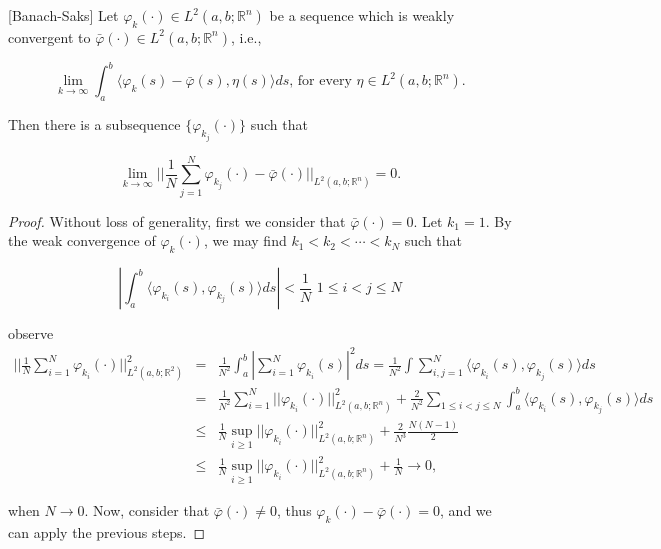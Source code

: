 \begin{theorem}\label{BST}[Banach-Saks]
Let $\varphi_k(\cdot)\in L^2(a,b;\mathbb{R}^n)$ be a sequence which is weakly convergent to $\bar{\varphi}(\cdot)\in L^2(a,b;\mathbb{R}^n)$, i.e.,

$$\lim_{k\rightarrow \infty} \int_{a}^{b} \langle\varphi_{k}(s)-\bar{\varphi}(s),\eta(s)\rangle ds,\,\mbox{for every}\,\, \eta\in L^2(a,b;\mathbb{R}^n).$$

Then there is a subsequence $\{\varphi_{k_j}(\cdot)\}$ such that

$$\lim_{k\rightarrow \infty}||\frac{1}{N}\sum_{j=1}^{N}\varphi_{k_j}(\cdot)-\bar{\varphi}(\cdot)||_{L^2(a,b;\mathbb{R}^n)}=0.$$
\end{theorem}
\begin{proof}
	Without loss of generality, first we consider that $\bar{\varphi}(\cdot)=0$. Let $k_1=1$. By the weak convergence of $\varphi_k(\cdot)$, we may find $k_1<k_2<\cdots <k_N$ such that
	
	$$|\int_{a}^{b}\langle\varphi_{k_i}(s),\varphi_{k_j}(s)\rangle ds|<\frac{1}{N}\,\, 1\leq i<j\leq N$$
	
	observe
	\begin{eqnarray*}
	||\frac{1}{N}\sum_{i=1}^{N}\varphi_{k_i}(\cdot)||^2_{L^2(a,b;\mathbb{R}^2)}&=&\frac{1}{N^2}\int_{a}^{b}|\sum_{i=1}^{N}\varphi_{k_i}(s)|^2 ds = \frac{1}{N^2}\int \sum_{i,j=1}^{N}\langle\varphi_{k_i}(s),\varphi_{k_j}(s)\rangle ds\\
	&=&\frac{1}{N^2}\sum_{i=1}^{N}||\varphi_{k_i}(\cdot)||^2_{L^2(a,b;\mathbb{R}^n)}+\frac{2}{N^2}\sum_{1\leq i<j\leq N}\int_{a}^{b}\langle\varphi_{k_i}(s),\varphi_{k_j}(s)\rangle ds\\
	&\leq& \frac{1}{N}\sup_{i\geq 1}||\varphi_{k_i}(\cdot)||^2_{L^2(a,b;\mathbb{R}^n)}+\frac{2}{N^3}\frac{N(N-1)}{2}\\
	&\leq& \frac{1}{N}\sup_{i\geq 1} ||\varphi_{k_i}(\cdot)||^2_{L^2(a,b;\mathbb{R}^n)}+\frac{1}{N}\rightarrow 0,
	\end{eqnarray*}
	
	when $N\rightarrow 0$. Now, consider that $\bar{\varphi}(\cdot)\neq 0$, thus $\varphi_{k}(\cdot)-\bar{\varphi}(\cdot)=0$, and we can apply the previous steps.
\end{proof}

